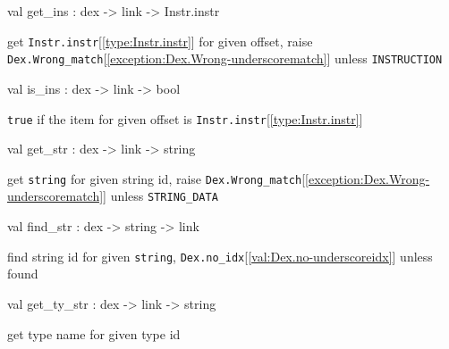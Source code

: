 \documentclass[11pt]{article}
\begin{document}
\label{val:Dex.get-underscoreins}\begin{ocamldoccode}
val get_ins : dex -> link -> Instr.instr
\end{ocamldoccode}
\begin{ocamldocdescription}
get {\tt{Instr.instr}}[\ref{type:Instr.instr}] for given offset,
 raise {\tt{Dex.Wrong\_match}}[\ref{exception:Dex.Wrong-underscorematch}] unless {\tt{INSTRUCTION}}


\end{ocamldocdescription}




\label{val:Dex.is-underscoreins}\begin{ocamldoccode}
val is_ins : dex -> link -> bool
\end{ocamldoccode}
\begin{ocamldocdescription}
{\tt{true}} if the item for given offset is {\tt{Instr.instr}}[\ref{type:Instr.instr}]


\end{ocamldocdescription}




\label{val:Dex.get-underscorestr}\begin{ocamldoccode}
val get_str : dex -> link -> string
\end{ocamldoccode}
\begin{ocamldocdescription}
get {\tt{string}} for given string id,
 raise {\tt{Dex.Wrong\_match}}[\ref{exception:Dex.Wrong-underscorematch}] unless {\tt{STRING\_DATA}}


\end{ocamldocdescription}




\label{val:Dex.find-underscorestr}\begin{ocamldoccode}
val find_str : dex -> string -> link
\end{ocamldoccode}
\begin{ocamldocdescription}
find string id for given {\tt{string}},
 {\tt{Dex.no\_idx}}[\ref{val:Dex.no-underscoreidx}] unless found


\end{ocamldocdescription}




\label{val:Dex.get-underscorety-underscorestr}\begin{ocamldoccode}
val get_ty_str : dex -> link -> string
\end{ocamldoccode}
\begin{ocamldocdescription}
get type name for given type id


\end{ocamldocdescription}
\end{document}
